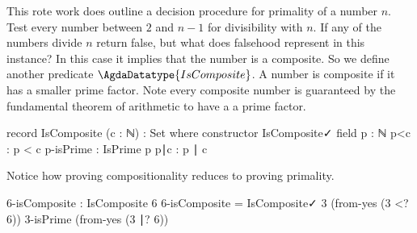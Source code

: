 \documentclass[./Thesis.tex]{subfiles}
\begin{document}
This rote work does outline a decision procedure for primality of a number $n$. Test every
number between $2$ and $n - 1$ for divisibility with $n$. If any of the numbers
divide $n$ return false, but what does falsehood represent in this instance?
In this case it implies that the number is a
composite. So we define another predicate $\AgdaDatatype{IsComposite}$. A number
is composite if it has a smaller prime factor. Note every composite number is
guaranteed by the fundamental theorem of arithmetic to have a a prime factor. 
\begin{code}
  record IsComposite (c : ℕ) : Set where
    constructor IsComposite✓
    field
      p : ℕ
      p<c : p < c
      p-isPrime : IsPrime p
      p∣c : p ∣ c
\end{code}
Notice how proving compositionality reduces to proving primality.
\begin{code}
  6-isComposite : IsComposite 6
  6-isComposite = IsComposite✓ 3 (from-yes (3 <? 6)) 3-isPrime (from-yes (3 ∣? 6))
\end{code}
\end{document}
